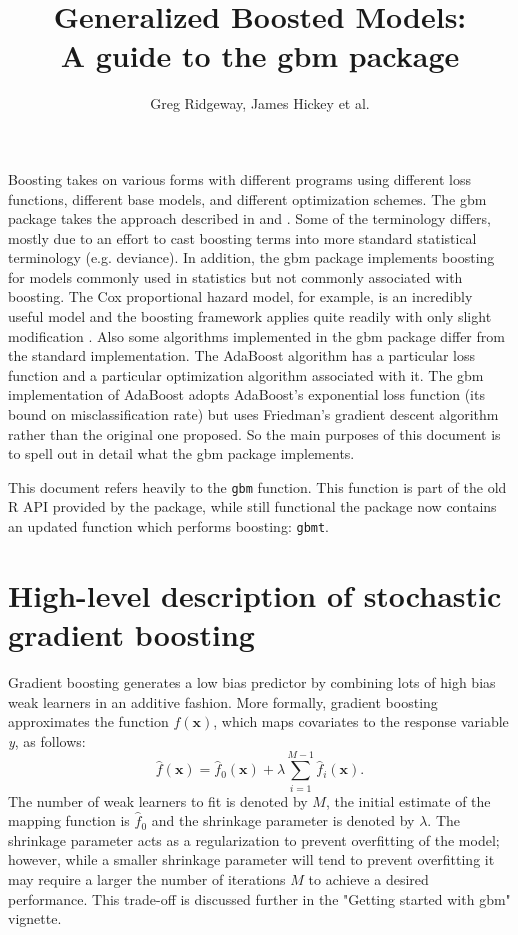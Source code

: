 \documentclass{article}
\title{Generalized Boosted Models:\\A guide to the gbm package} \author{Greg Ridgeway, James Hickey et al.}
\begin{document}


\maketitle


Boosting takes on various forms with different programs using
different loss functions, different base models, and different
optimization schemes. The gbm package takes the approach described in
\cite{Friedman:2001} and \cite{Friedman:2002}. Some of the terminology
differs, mostly due to an effort to cast boosting terms into more
standard statistical terminology (e.g. deviance). In addition, the gbm
package implements boosting for models commonly used in statistics but
not commonly associated with boosting. The Cox proportional hazard
model, for example, is an incredibly useful model and the boosting
framework applies quite readily with only slight modification
\cite{Ridgeway:1999}. Also some algorithms implemented in the gbm
package differ from the standard implementation. The AdaBoost
algorithm \cite{FreundSchapire:1997} has a particular loss function
and a particular optimization algorithm associated with it. The gbm
implementation of AdaBoost adopts AdaBoost's exponential loss function
(its bound on misclassification rate) but uses Friedman's gradient
descent algorithm rather than the original one proposed. So the main
purposes of this document is to spell out in detail what the gbm
package implements.

This document refers heavily to the \texttt{gbm} function.  This 
function is part of the old R API provided by the package, while
still functional the package now contains an updated function which
performs boosting: \texttt{gbmt}.

\section{High-level description of stochastic gradient boosting}
Gradient boosting generates a low bias predictor by combining lots of high bias weak learners in an additive fashion. More formally, gradient boosting approximates the function $f(\textbf{x})$, which maps covariates to the response variable \textit{y}, as follows:
\begin{equation}
\label{eq:boosting_eqn}
\hat{f}(\mathbf{x}) = \hat{f}_{0}(\mathbf{x}) + \lambda \sum_{i=1}^{M-1} \hat{f}_{i}(\mathbf{x}).
\end{equation}
The number of weak learners to fit is denoted by $M$, the initial estimate of the mapping function is $\hat{f}_0$ and the shrinkage parameter is denoted by $\lambda$.  The shrinkage parameter acts as a regularization to prevent overfitting of the model; however, while a smaller shrinkage parameter will tend to prevent overfitting it may require a larger the number of iterations $M$ to achieve a desired performance.  This trade-off is discussed further in the "Getting started with gbm" vignette.
\end{document}

